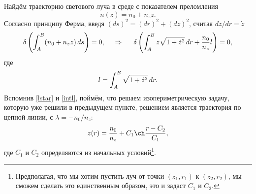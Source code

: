 Найдём траекторию светового луча в среде с показателем преломления
\begin{equation*}
    n(z) = n_0 + n_z z.
\end{equation*}
Согласно принципу Ферма, введя $(ds)^2 = (dr)^2 + (dz)^2$, считая $dz / dr = \dot{z}$
\begin{equation*}
    \delta \left(
        \int_A^B (n_0 + n_z z) \, d s
    \right) = 0,
\hspace{0.5cm} \Rightarrow \hspace{0.5cm} 
    \delta
    \left(
        \int_A^B z \sqrt{1 + \dot{z}^2} \, d r
    + \frac{n_0}{n_z}  l 
    \right) = 0,
\end{equation*}
где
\begin{equation*}
    l = \int_A^B \sqrt{1 + \dot{z}^2} \, d r.
\end{equation*}
Вспомнив \eqref{lstar} и \eqref{intl}, 
поймём, что решаем изопериметрическую задачу, которую уже решили в предыдущем пункте, решением является траектория по цепной линии, с $\lambda = -n_0/n_z$:
\begin{equation}
    z(r) = \frac{n_0}{n_z} + C_1 \ch \frac{r-C_2}{C_1},
\end{equation}
где $C_1$ и $C_2$ определяются из начальных условий\footnote{
    Предполагая, что мы хотим пустить луч от точки $(z_1, r_1)$ к $(z_2, r_2)$, мы сможем сделать это единственным образом, это и задаст $C_1$ и $C_2$.
}.